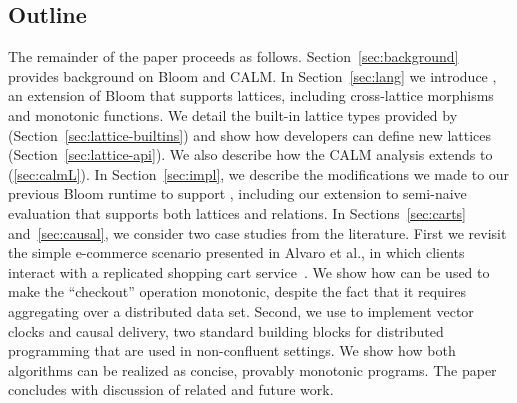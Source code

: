 \subsection{Outline}
The remainder of the paper proceeds as follows.  Section~\ref{sec:background}
provides background on Bloom and CALM.  In Section~\ref{sec:lang} we introduce
\lang, an extension of Bloom that supports lattices, including cross-lattice
morphisms and monotonic functions. We detail the built-in lattice types provided
by \lang (Section~\ref{sec:lattice-builtins}) and show how developers can define
new lattices (Section~\ref{sec:lattice-api}).  We also describe how the
CALM analysis extends to \lang (\ref{sec:calmL}).  In Section~\ref{sec:impl}, we
describe the modifications we made to our previous Bloom runtime to support
\lang, including our extension to semi-naive evaluation that supports both
lattices and relations.  In Sections~\ref{sec:carts} and~\ref{sec:causal}, we
consider two case studies from the literature.  First we revisit the simple
e-commerce scenario presented in Alvaro et al., in which clients interact with a
replicated shopping cart service~\cite{Alvaro2011}. We show how \lang can be
used to make the ``checkout'' operation monotonic, despite the fact that it
requires aggregating over a distributed data set.  Second, we use \lang to
implement vector clocks and causal delivery, two standard building blocks for
distributed programming that are used in non-confluent settings. We show how
both algorithms can be realized as concise, provably monotonic \lang programs.
The paper concludes with discussion of related and future work.

